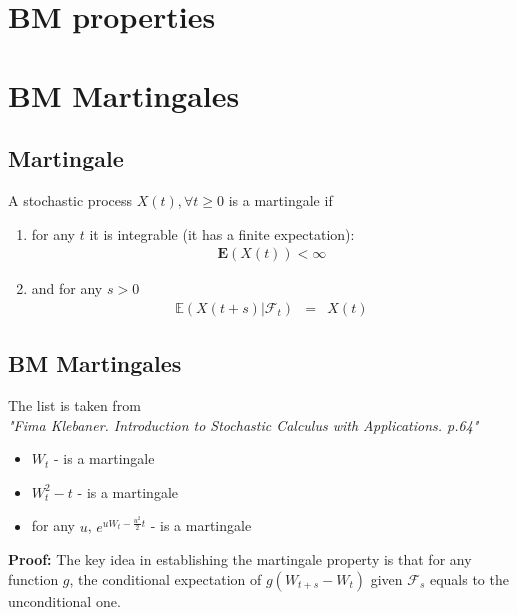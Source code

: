 \section{BM properties}


\section{BM Martingales}

\subsection{Martingale}
A stochastic process ${X(t), \forall t \geq 0}$ is a martingale if
\begin{enumerate}
	\item for any $t$ it is integrable (it has a finite expectation):
	\begin{eqnarray}
		\mathbf{E}(X(t)) < \infty
	\end{eqnarray}
	\item and for any $s > 0$
	\begin{eqnarray}
	\mathbb{E}(X(t + s)\vert \mathscr{F}_{t}) &=& X(t)
	\end{eqnarray}
\end{enumerate}

\subsection{BM Martingales}
The list is taken from\\
\textit{"Fima Klebaner. Introduction to Stochastic Calculus with Applications. p.64"}
\begin{itemize}
	\item \textbf{\color{blue}$W_{t}$} - is a martingale
	\item \textbf{\color{blue}$W_{t}^{2} - t$} - is a martingale
	\item for any $u$, \textbf{\color{blue}$e^{uW_{t} - \frac{u^{2}}{2}t}$} - is a martingale
\end{itemize}
\textbf{Proof:} The key idea in establishing the martingale property is that for any function $g$, the conditional expectation of $g(W_{t + s} - W_{t})$ given $\mathscr{F}_{s}$ equals to the unconditional one.

